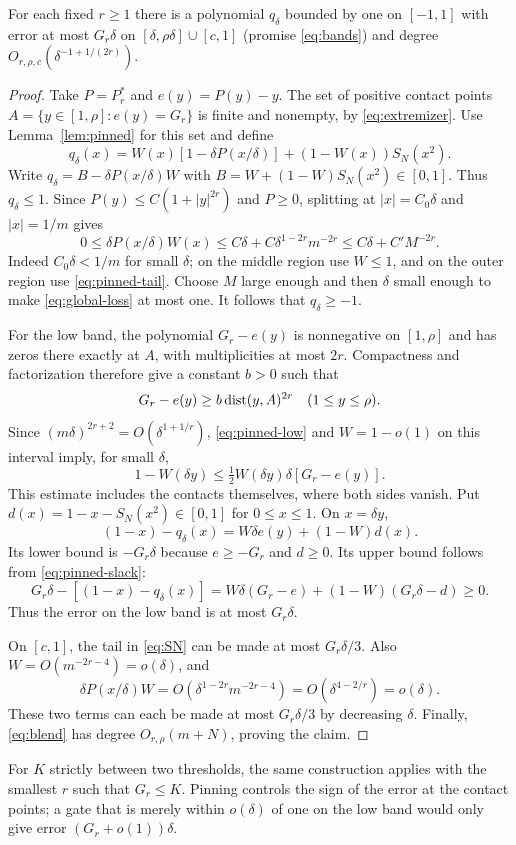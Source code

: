 \begin{proposition}\label{prop:threshold-upper}
For each fixed $r\geq1$ there is a polynomial $q_\delta$ bounded by one on $[-1,1]$ with error at most $G_r\delta$ on $[\delta,\rho\delta]\cup[c,1]$ (promise \eqref{eq:bands}) and degree $O_{r,\rho,c}(\delta^{-1+1/(2r)})$.
\end{proposition}
\begin{proof}
Take $P=P_r^*$ and $e(y)=P(y)-y$. The set of positive contact points
$A=\{y\in[1,\rho]:e(y)=G_r\}$ is finite and nonempty, by \eqref{eq:extremizer}. Use Lemma~\ref{lem:pinned} for this set and define
\begin{equation}\label{eq:blend}
 q_\delta(x)=W(x)[1-\delta P(x/\delta)]+(1-W(x))S_N(x^2).
\end{equation}
Write $q_\delta=B-\delta P(x/\delta)W$ with $B=W+(1-W)S_N(x^2)\in[0,1]$. Thus $q_\delta\leq1$. Since $P(y)\leq C(1+|y|^{2r})$ and $P\geq0$, splitting at $|x|=C_0\delta$ and $|x|=1/m$ gives
\begin{equation}\label{eq:global-loss}
 0\leq\delta P(x/\delta)W(x)
 \leq C\delta+C\delta^{1-2r}m^{-2r}
 \leq C\delta+C'M^{-2r}.
\end{equation}
Indeed $C_0\delta<1/m$ for small $\delta$; on the middle region use $W\leq1$, and on the outer region use \eqref{eq:pinned-tail}. Choose $M$ large enough and then $\delta$ small enough to make \eqref{eq:global-loss} at most one. It follows that $q_\delta\geq-1$.

For the low band, the polynomial $G_r-e(y)$ is nonnegative on $[1,\rho]$ and has zeros there exactly at $A$, with multiplicities at most $2r$. Compactness and factorization therefore give a constant $b>0$ such that
\[
 G_r-e(y)\geq b\operatorname{dist}(y,A)^{2r}\quad(1\leq y\leq\rho).
\]
Since $(m\delta)^{2r+2}=O(\delta^{1+1/r})$, \eqref{eq:pinned-low} and $W=1-o(1)$ on this interval imply, for small $\delta$,
\begin{equation}\label{eq:pinned-slack}
 1-W(\delta y)\leq\tfrac12 W(\delta y)\delta[G_r-e(y)].
\end{equation}
This estimate includes the contacts themselves, where both sides vanish. Put $d(x)=1-x-S_N(x^2)\in[0,1]$ for $0\leq x\leq1$. On $x=\delta y$,
\[
 (1-x)-q_\delta(x)=W\delta e(y)+(1-W)d(x).
\]
Its lower bound is $-G_r\delta$ because $e\geq-G_r$ and $d\geq0$. Its upper bound follows from \eqref{eq:pinned-slack}:
\[
 G_r\delta-[(1-x)-q_\delta(x)]
 =W\delta(G_r-e)+(1-W)(G_r\delta-d)\geq0.
\]
Thus the error on the low band is at most $G_r\delta$.

On $[c,1]$, the tail in \eqref{eq:SN} can be made at most $G_r\delta/3$. Also $W=O(m^{-2r-4})=o(\delta)$, and
\[
 \delta P(x/\delta)W=O(\delta^{1-2r}m^{-2r-4})
 =O(\delta^{4-2/r})=o(\delta).
\]
These two terms can each be made at most $G_r\delta/3$ by decreasing $\delta$. Finally, \eqref{eq:blend} has degree $O_{r,\rho}(m+N)$, proving the claim.
\end{proof}
For $K$ strictly between two thresholds, the same construction applies with the smallest $r$ such that $G_r\leq K$. Pinning controls the sign of the error at the contact points; a gate that is merely within $o(\delta)$ of one on the low band would only give error $(G_r+o(1))\delta$.

